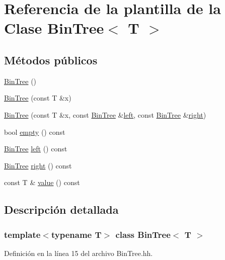 \hypertarget{class_bin_tree}{}\section{Referencia de la plantilla de la Clase Bin\+Tree$<$ T $>$}
\label{class_bin_tree}
\subsection*{Métodos públicos}
\begin{DoxyCompactItemize}
\item 
\mbox{\hyperlink{class_bin_tree_a47eef22d29cd023449d97c073c08e5b6}{Bin\+Tree}} ()
\item 
\mbox{\hyperlink{class_bin_tree_a1ab686e0bcf990093ff91fe71744c1a4}{Bin\+Tree}} (const T \&x)
\item 
\mbox{\hyperlink{class_bin_tree_adb7eeff76d08130c943b36af215eb521}{Bin\+Tree}} (const T \&x, const \mbox{\hyperlink{class_bin_tree}{Bin\+Tree}} \&\mbox{\hyperlink{class_bin_tree_a82108db4c1b08d1f111027788c196d4e}{left}}, const \mbox{\hyperlink{class_bin_tree}{Bin\+Tree}} \&\mbox{\hyperlink{class_bin_tree_aff8e96651b27284c329667b5ad3e4d0b}{right}})
\item 
bool \mbox{\hyperlink{class_bin_tree_a74cda259ba5c25b8ee38ed4dc33e4fad}{empty}} () const
\item 
\mbox{\hyperlink{class_bin_tree}{Bin\+Tree}} \mbox{\hyperlink{class_bin_tree_a82108db4c1b08d1f111027788c196d4e}{left}} () const
\item 
\mbox{\hyperlink{class_bin_tree}{Bin\+Tree}} \mbox{\hyperlink{class_bin_tree_aff8e96651b27284c329667b5ad3e4d0b}{right}} () const
\item 
const T \& \mbox{\hyperlink{class_bin_tree_a734e785b089c87b49187ee7c58edf5f3}{value}} () const
\end{DoxyCompactItemize}


\subsection{Descripción detallada}
\subsubsection*{template$<$typename T$>$\newline
class Bin\+Tree$<$ T $>$}



Definición en la línea 15 del archivo Bin\+Tree.\+hh.



